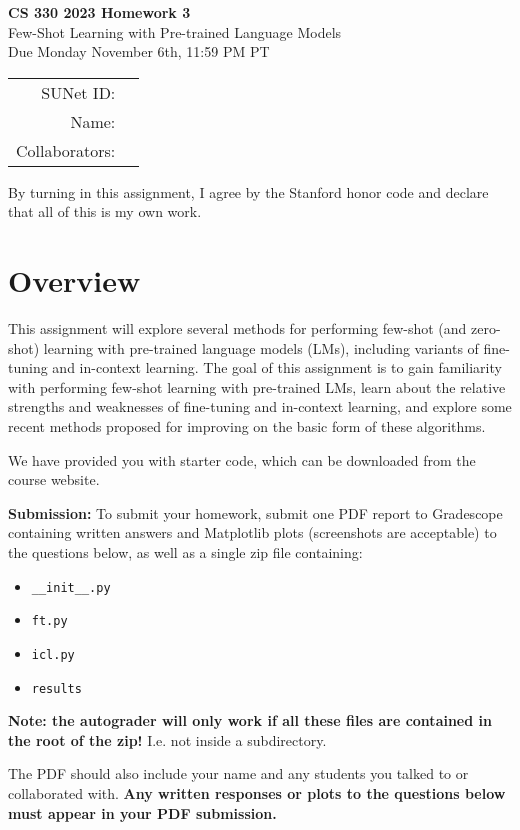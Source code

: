 \documentclass[12pt]{article}
\begin{document}
\begin{center}
{\Large \textbf{CS 330 2023 Homework 3} \\ Few-Shot Learning with Pre-trained Language Models
\\ 
\vspace{0.2cm}
Due Monday November 6th, 11:59 PM PT}

\begin{tabular}{rl}
SUNet ID: &  \\
Name: & \\
Collaborators: & 
\end{tabular}
\end{center}

By turning in this assignment, I agree by the Stanford honor code and declare that all of this is my own work.

\section*{Overview}
This assignment will explore several methods for performing few-shot (and zero-shot) learning with pre-trained language models (LMs), including variants of fine-tuning and in-context learning. The goal of this assignment is to gain familiarity with performing few-shot learning with pre-trained LMs, learn about the relative strengths and weaknesses of fine-tuning and in-context learning, and explore some recent methods proposed for improving on the basic form of these algorithms.

\noindent We have provided you with starter code, which can be downloaded from the course website.

\textbf{Submission:} To submit your homework, submit one PDF report to Gradescope containing written answers and Matplotlib plots (screenshots are acceptable) to the questions below, as well as a single zip file containing:
\begin{itemize}
    \item \texttt{\_\_init\_\_.py}
    \item \texttt{ft.py}
    \item \texttt{icl.py}
    \item \texttt{results}
\end{itemize}
\textbf{Note: the autograder will only work if all these files are contained in the root of the zip!} I.e. not inside a subdirectory.

 The PDF should also include your name and any students you talked to or collaborated with. \textbf{Any written responses or plots to the questions below must appear in your PDF submission.}
\end{document}
